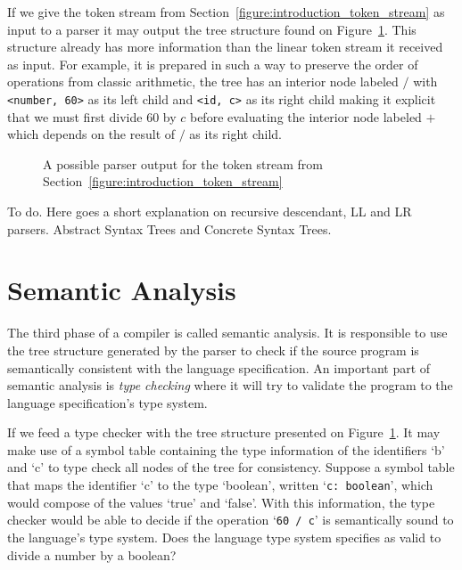 \documentclass[
    oneside,
    english,
    embeddedlogo,
    noabntexcite
]{ufsc-thesis-rn46-2019}
\begin{document}
If we give the token stream from Section~\ref{figure:introduction_token_stream} as input to a parser it may output the tree structure found on Figure~\ref{figure:introduction_ast}.
This structure already has more information than the linear token stream it received as input.
For example, it is prepared in such a way to preserve the order of operations from classic arithmetic, the tree has an interior node labeled $/$ with \verb+<number, 60>+ as its left child and \verb+<id, c>+ as its right child making it explicit that we must first divide $60$ by $c$ before evaluating the interior node labeled $+$ which depends on the result of $/$ as its right child.

\begin{figure}[ht]\label{figure:introduction_ast}
    \centering
    \caption{A possible parser output for the token stream from Section~\ref{figure:introduction_token_stream}}
\end{figure}

To do. Here goes a short explanation on recursive descendant, LL and LR parsers. Abstract Syntax Trees and Concrete Syntax Trees.

\section{Semantic Analysis}\label{chapter:background:sec:semantic}

The third phase of a compiler is called semantic analysis.
It is responsible to use the tree structure generated by the parser to check if the source program is semantically consistent with the language specification.
An important part of semantic analysis is \textit{type checking} where it will try to validate the program to the language specification's type system.

If we feed a type checker with the tree structure presented on Figure~\ref{figure:introduction_ast}.
It may make use of a symbol table containing the type information of the identifiers `b' and `c' to type check all nodes of the tree for consistency.
Suppose a symbol table that maps the identifier `c' to the type `boolean', written `\verb+c: boolean+', which would compose of the values `true' and `false'.
With this information, the type checker would be able to decide if the operation `\verb+60 / c+' is semantically sound to the language's type system.
Does the language type system specifies as valid to divide a number by a boolean?
\end{document}
